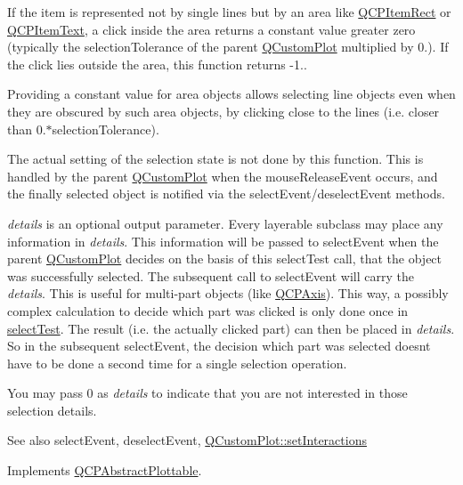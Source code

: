 If the item is represented not by single lines but by an area like \hyperlink{class_q_c_p_item_rect}{Q\+C\+P\+Item\+Rect} or \hyperlink{class_q_c_p_item_text}{Q\+C\+P\+Item\+Text}, a click inside the area returns a constant value greater zero (typically the selection\+Tolerance of the parent \hyperlink{class_q_custom_plot}{Q\+Custom\+Plot} multiplied by 0.). If the click lies outside the area, this function returns -\/1..

Providing a constant value for area objects allows selecting line objects even when they are obscured by such area objects, by clicking close to the lines (i.\+e. closer than 0.$\ast$selection\+Tolerance).

The actual setting of the selection state is not done by this function. This is handled by the parent \hyperlink{class_q_custom_plot}{Q\+Custom\+Plot} when the mouse\+Release\+Event occurs, and the finally selected object is notified via the select\+Event/deselect\+Event methods.

{\itshape details} is an optional output parameter. Every layerable subclass may place any information in {\itshape details}. This information will be passed to select\+Event when the parent \hyperlink{class_q_custom_plot}{Q\+Custom\+Plot} decides on the basis of this select\+Test call, that the object was successfully selected. The subsequent call to select\+Event will carry the {\itshape details}. This is useful for multi-\/part objects (like \hyperlink{class_q_c_p_axis}{Q\+C\+P\+Axis}). This way, a possibly complex calculation to decide which part was clicked is only done once in \hyperlink{class_q_c_p_statistical_box_a7d3ac843dc48a085740fdfc4319a89cc}{select\+Test}. The result (i.\+e. the actually clicked part) can then be placed in {\itshape details}. So in the subsequent select\+Event, the decision which part was selected doesn\textquotesingle{}t have to be done a second time for a single selection operation.

You may pass 0 as {\itshape details} to indicate that you are not interested in those selection details.

\begin{DoxySeeAlso}{See also}
select\+Event, deselect\+Event, \hyperlink{class_q_custom_plot_a5ee1e2f6ae27419deca53e75907c27e5}{Q\+Custom\+Plot\+::set\+Interactions} 
\end{DoxySeeAlso}


Implements \hyperlink{class_q_c_p_abstract_plottable_a1fc81aa273e9e8db84c1056bc0181fdb}{Q\+C\+P\+Abstract\+Plottable}.



